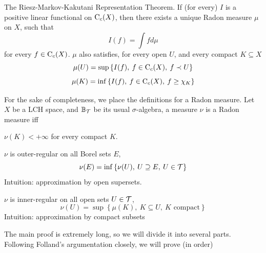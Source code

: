 \documentclass[../../main.tex]{subfiles}
\begin{document}
\graphicspath{{../../images/}{images/}}

\begin{wts}
    The Riesz-Markov-Kakutani Representation Theorem. If (for every) $I$ is a positive linear functional on $\operatorname{C}_c({X})$, then there exists a unique Radon measure $\mu$ on $X$, such that
    \[
    I(f) = \int fd\mu
    \]
    for every $f\in\operatorname{C}_c({X})$. $\mu$ also satisfies, for every open $U$, and every compact $K\subseteq X$
    \begin{equation}\label{open approximated by If}
        \mu(U) = \sup\left\{I(f),\:f\in\operatorname{C}_c({X}),\:f\prec U\right\}
    \end{equation}
    \begin{equation}\label{compact approximated by If}
        \mu(K)=\inf\left\{I(f),\:f\in\operatorname{C}_c({X}),\:f\geq\chi_K\right\}
    \end{equation}
\end{wts}
\providecommand{\borel}{\mathbb{B}_{\Tau}} %
\providecommand{\mustar}{\mu^*} %
%
For the sake of completeness, we place the definitions for a Radon measure. Let $X$ be a LCH space, and $\borel$ be its usual $\sigma$-algebra, a measure $\nu$ is a Radon measure iff
\begin{enumroman}
    \item $\nu(K)<+\infty$ for every compact $K$.
    \item $\nu$ is outer-regular on all Borel sets $E$,
    \[
    \nu(E) = \inf\left\{\nu(U),\: U\supseteq E,\:U\in\mathcal{T}\right\}
    \]
    Intuition: approximation by open supersets.
    \item $\nu$ is inner-regular on all open sets $U\in\mathcal{T}$,
    \[
    \nu(U) = \sup\left\{\mu(K),\: K\subseteq U,\:K\text{ compact}\right\}
    \]
    Intuition: approximation by compact subsets 
\end{enumroman}
%
%
The main proof is extremely long, so we will divide it into several parts. Following Folland's argumentation closely, we will prove (in order)
%
%
\end{document}
